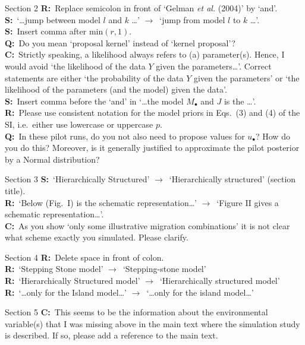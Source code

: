 \documentclass[11pt]{article}
\newenvironment{my_description}
{\begin{description}
  \setlength{\itemsep}{2pt}
  \setlength{\parskip}{0pt}
  \setlength{\parsep}{0pt}}
{\end{description}}
\newcommand{\ra}{$\rightarrow$\ }
\newcommand{\C}{\textbf{C:}\ }
\newcommand{\Q}{\textbf{Q:}\ }
\newcommand{\R}{\textbf{R:}\ }
\newcommand{\V}{\textbf{S:}\ }
\begin{document}
\begin{my_description}
	\item[Section 2] \R Replace semicolon in front of `Gelman \emph{et al.} (2004)' by `and'.\\
	\V `\dots jump between model $l$ and $k$ \dots' \ra `jump from model $l$ to $k$ \dots'.\\
	\V Insert comma after $\mathrm{min}(r,1)$.\\
	\Q Do you mean `proposal kernel' instead of `kernel proposal'?\\
	\C Strictly speaking, a likelihood always refers to (a) parameter(s). Hence, I would avoid `the likelihood of the data $Y$ given the parameters\dots'. Correct statements are either `the probability of the data $Y$ given the parameters' or `the likelihood of the parameters (and the model) given the data'.\\
	\V Insert comma before the `and' in `\dots the model $M_{\bullet}$ and $J$ is the \dots'.\\
	\R Please use consistent notation for the model priors in Eqs.\ (3) and (4) of the SI, i.e.\ either use lowercase or uppercase $p$.\\
	\Q In these pilot runs, do you not also need to propose values for $u_{\bullet}$? How do you do this? Moreover, is it generally justified to approximate the pilot posterior by a Normal distribution?
	
	\item[Section 3] \V `Hierarchically Structured' \ra `Hierarchically structured' (section title).\\
	\R `Below (Fig.\ I) is the schematic representation\dots' \ra `Figure II gives a schematic representation\dots'.\\
	\C As you show `only some illustrative migration combinations' it is not clear what scheme exactly you simulated. Please clarify.\\
	
	\item[Section 4] \R Delete space in front of colon.\\
	\R `Stepping Stone model' \ra `Stepping-stone model'\\
	\R `Hierarchically Structured model' \ra `Hierarchically structured model'
	\R `\dots only for the Island model\dots' \ra `\dots only for the island model\dots'
	
	\item[Section 5] \C This seems to be the information about the environmental variable(s) that I was missing above in the main text where the simulation study is described. If so, please add a reference to the main text.\\
	

\end{my_description}
\end{document}
